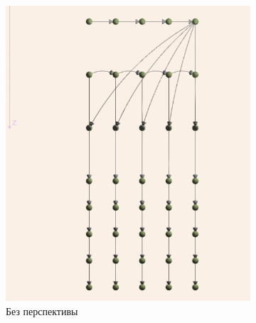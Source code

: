 \documentclass[12pt, fleqn]{article}
\theoremstyle{definition}
\begin{document}
\begin{figure}[ht]
\begin{subfigure}{0.5\textwidth}
 \begin{center}
 \includegraphics[scale=0.7]{XZ_proj.png}
 \caption{Без перспективы}
\end{center}
\end{subfigure}
\begin{subfigure}{0.49\textwidth}
 \begin{center}

\end{center}
\end{subfigure}
\end{figure}
\end{document}

